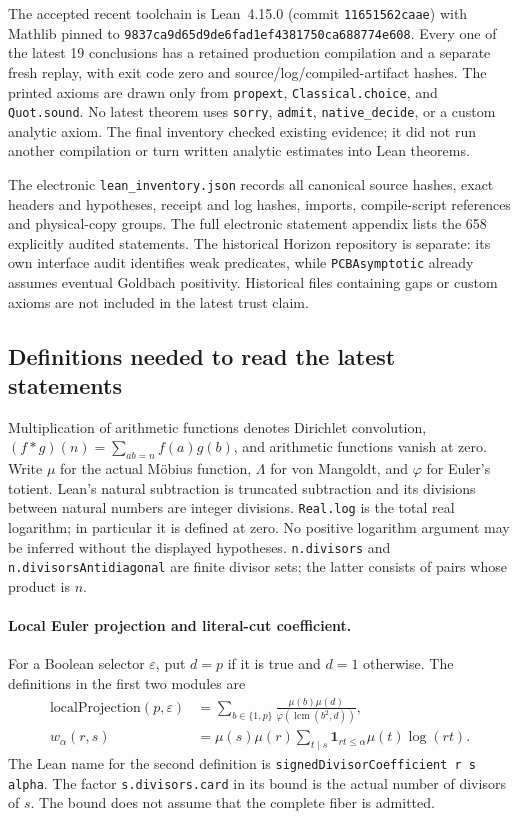\documentclass[11pt,a4paper]{article}
\theoremstyle{definition}
\theoremstyle{remark}
\newcommand{\muMob}{\mu}
\newcommand{\Lam}{\Lambda}
\newcommand{\ph}{\varphi}
\begin{document}
The accepted recent toolchain is Lean~4.15.0 (commit
\texttt{11651562caae}) with Mathlib pinned to
\nolinkurl{9837ca9d65d9de6fad1ef4381750ca688774e608}.
Every one of the latest 19 conclusions has a retained production
compilation and a separate fresh replay, with exit code zero and
source/log/compiled-artifact hashes. The printed axioms are drawn only
from \texttt{propext}, \texttt{Classical.choice}, and \texttt{Quot.sound}.
No latest theorem uses \texttt{sorry}, \texttt{admit},
\texttt{native\_decide}, or a custom analytic axiom.
The final inventory checked existing evidence; it did not run another
compilation or turn written analytic estimates into Lean theorems.

The electronic \texttt{lean\_inventory.json} records all canonical source
hashes, exact headers and hypotheses, receipt and log hashes, imports,
compile-script references and physical-copy groups. The full electronic
statement appendix lists the 658 explicitly audited statements. The
historical Horizon repository is separate: its own interface audit
identifies weak predicates, while \texttt{PCBAsymptotic} already assumes
eventual Goldbach positivity. Historical files containing gaps or custom
axioms are not included in the latest trust claim.

\subsection{Definitions needed to read the latest statements}

Multiplication of arithmetic functions denotes Dirichlet convolution,
\((f*g)(n)=\sum_{ab=n}f(a)g(b)\), and arithmetic functions vanish at zero.
Write \(\muMob\) for the actual M\"obius function,
\(\Lam\) for von Mangoldt, and \(\ph\) for Euler's totient.
Lean's natural subtraction is truncated subtraction and its divisions
between natural numbers are integer divisions. \texttt{Real.log} is the
total real logarithm; in particular it is defined at zero. No positive
logarithm argument may be inferred without the displayed hypotheses.
\texttt{n.divisors} and \texttt{n.divisorsAntidiagonal} are finite divisor
sets; the latter consists of pairs whose product is \(n\).

\paragraph{Local Euler projection and literal-cut coefficient.}
For a Boolean selector \(\varepsilon\), put \(d=p\) if it is true
and \(d=1\) otherwise. The definitions in the first two modules are
\begin{align*}
 \mathrm{localProjection}(p,\varepsilon)
 &=\sum_{b\in\{1,p\}}
   \frac{\muMob(b)\muMob(d)}{\ph(\operatorname{lcm}(b^2,d))},\\
 w_\alpha(r,s)
 &=\muMob(s)\muMob(r)
   \sum_{t\mid s}\mathbf1_{rt\le\alpha}\muMob(t)\log(rt).
\end{align*}
The Lean name for the second definition is
\texttt{signedDivisorCoefficient r s alpha}. The factor
\texttt{s.divisors.card} in its bound is the actual number of divisors
of \(s\). The bound does not assume that the complete fiber is admitted.
\end{document}
